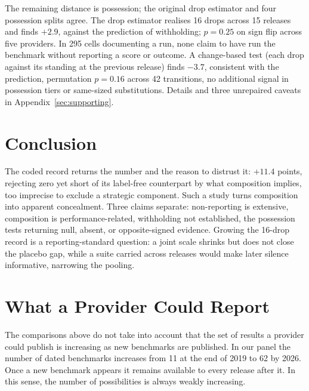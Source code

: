 \documentclass{article}
\begin{document}
The remaining distance is possession; the original drop estimator and four possession splits agree. The drop estimator realises 16 drops across 15 releases and finds $+2.9$, against the prediction of withholding; $p = 0.25$ on sign flip across five providers. In 295 cells documenting a run, none claim to have run the benchmark without reporting a score or outcome. A change-based test (each drop against its standing at the previous release) finds $-3.7$, consistent with the prediction, permutation $p = 0.16$ across 42 transitions, no additional signal in possession tiers or same-sized substitutions. Details and three unrepaired caveats in Appendix~\ref{sec:supporting}.
\section{Conclusion}\label{sec:conclusion}

The coded record returns the number and the reason to distrust it: $+11.4$ points, rejecting zero yet short of its label-free counterpart by what composition implies, too imprecise to exclude a strategic component. Such a study turns composition into apparent concealment. Three claims separate: non-reporting is extensive, composition is performance-related, withholding not established, the possession tests returning null, absent, or opposite-signed evidence. Growing the 16-drop record is a reporting-standard question: a joint scale \citep{epoch2026rosetta} shrinks but does not close the placebo gap, while a suite carried across releases would make later silence informative, narrowing the \citet{dye1985} pooling.




\newpage
\appendix
\section{What a Provider Could Report}\label{sec:opportunity}

The comparisons above do not take into account that the set of results a provider could publish is increasing as new benchmarks are published. In our panel the number of dated benchmarks increases from 11 at the end of 2019 to 62 by 2026. Once a new benchmark appears it remains available to every release after it. In this sense, the number of possibilities is always weakly increasing.
\end{document}
